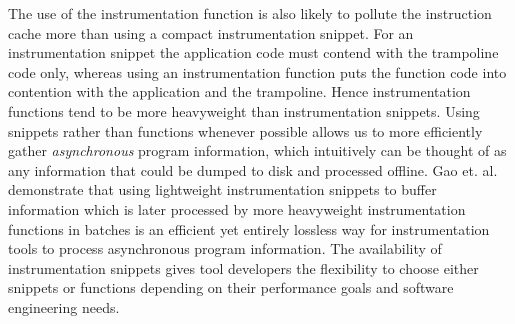 The use of the instrumentation function is also likely to pollute the instruction cache more than using a compact
instrumentation snippet. For an instrumentation snippet the application code must contend with the trampoline code
only, whereas using an instrumentation function puts the function code into contention with the application and the
trampoline. Hence 
instrumentation functions tend to be more heavyweight than instrumentation snippets. Using snippets rather than functions 
whenever possible allows us to more efficiently gather 
\textit{asynchronous} program information, which intuitively can be thought of as any information that could be dumped to
disk and processed offline. Gao et. al. \cite{gao2005aliter} demonstrate that using lightweight instrumentation snippets 
to buffer information which is later processed by more heavyweight instrumentation functions in batches is an efficient
yet entirely lossless way for instrumentation tools to process asynchronous program information. The availability of instrumentation 
snippets gives tool developers the flexibility to choose either snippets or functions
depending on their performance goals and software engineering needs.
